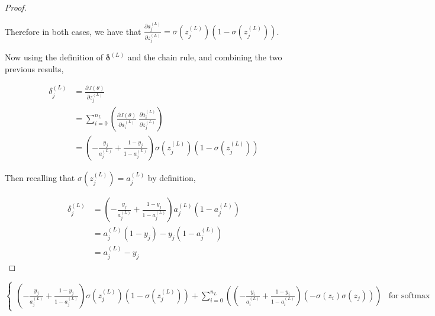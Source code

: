 \documentclass{article}[11pt]
\begin{document}
\begin{proof}
\begin{itemize}
            \end{itemize}
            
            Therefore in both cases, we have that $\frac{\partial a^{(L)}_j}{\partial z^{(L)}_j} = \sigma(z^{(L)}_j) \left( 1 - \sigma(z^{(L)}_j) \right)$.
            
            Now using the definition of $\mathbf{\delta}^{(L)}$ and the chain rule, and combining the two previous results,
            
            $$ \begin{aligned}
            \delta^{(L)}_j &= \frac{\partial J(\theta)}{\partial z^{(L)}_j} \\
            &= \sum_{i = 0}^{n_L} \left( \frac{\partial J(\theta)}{\partial a^{(L)}_i} \ \frac{\partial a^{(L)}_i}{\partial z^{(L)}_j} \right) \\
            &= \left( - \frac{y_j}{a^{(L)}_j} + \frac{1 - y_j}{1 - a^{(L)}_j} \right) \sigma(z^{(L)}_j) \left( 1 - \sigma(z^{(L)}_j) \right)
            \end{aligned} $$
            
            Then recalling that $\sigma(z^{(L)}_j) = a^{(L)}_j$ by definition,
            
            $$ \begin{aligned}
            \delta^{(L)}_j &= \left( - \frac{y_j}{a^{(L)}_j} + \frac{1 - y_j}{1 - a^{(L)}_j} \right) a^{(L)}_j \left( 1 - a^{(L)}_j \right) \\
            &= a^{(L)}_j (1 - y_j) - y_j (1 - a^{(L)}_j) \\
            &= a^{(L)}_j - y_j
            \end{aligned} $$
            
    
    
    
        \end{proof}




$$ \begin{cases}
\left( - \frac{y_j}{a^{(L)}_j} + \frac{1 - y_j}{1 - a^{(L)}_j} \right) \sigma(z^{(L)}_j) \left( 1 - \sigma(z^{(L)}_j) \right) + \sum_{i=0}^{n_L} \left( \left( - \frac{y_i}{a^{(L)}_i} + \frac{1 - y_i}{1 - a^{(L)}_i} \right) \left( - \sigma(z_i) \sigma(z_j) \right) \right) & \text{for softmax activation}
\end{cases}$$
        
\end{document}

